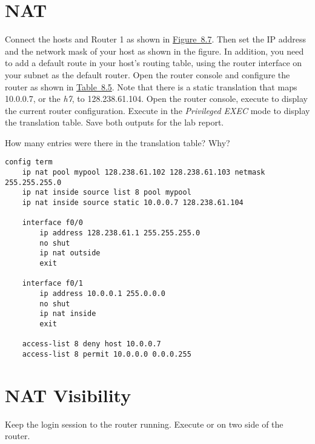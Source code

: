 \documentclass{../UTNetLab}
\begin{document}
\section{NAT}
Connect the hosts and Router 1 as shown in \hyperref[fig:8.7]{Figure~8.7}.
Then set the IP address and the network mask of your host as shown in the figure.
In addition, you need to add a default route in your host’s routing table, using the router interface on your subnet as the default router.
Open the router console and configure the router as shown in \hyperref[tab:8.5]{Table~8.5}.
Note that there is a static translation that maps 10.0.0.7, or the \textit{h7}, to 128.238.61.104.
Open the router console, execute  to display the current router configuration.
Execute  in the \textit{Privileged EXEC} mode to display the translation table.
Save both outputs for the lab report.

\begin{report}
    \item How many entries were there in the translation table? Why?
\end{report}

\begin{minipage}{\linewidth}
\begin{lstlisting}[language={cisco}, emph={mypool}, caption={NAT Router Configuration in \hyperref[fig:8.7]{Figure~8.7} (Table~8.5)\label{tab:8.5}}]
config term
    ip nat pool mypool 128.238.61.102 128.238.61.103 netmask 255.255.255.0
    ip nat inside source list 8 pool mypool
    ip nat inside source static 10.0.0.7 128.238.61.104

    interface f0/0
        ip address 128.238.61.1 255.255.255.0
        no shut
        ip nat outside
        exit

    interface f0/1
        ip address 10.0.0.1 255.0.0.0
        no shut
        ip nat inside
        exit

    access-list 8 deny host 10.0.0.7
    access-list 8 permit 10.0.0.0 0.0.0.255
    \end{lstlisting}
\end{minipage}

\section{NAT Visibility}
Keep the login session to the router running.
Execute  or  on two side of the router.
\end{document}
